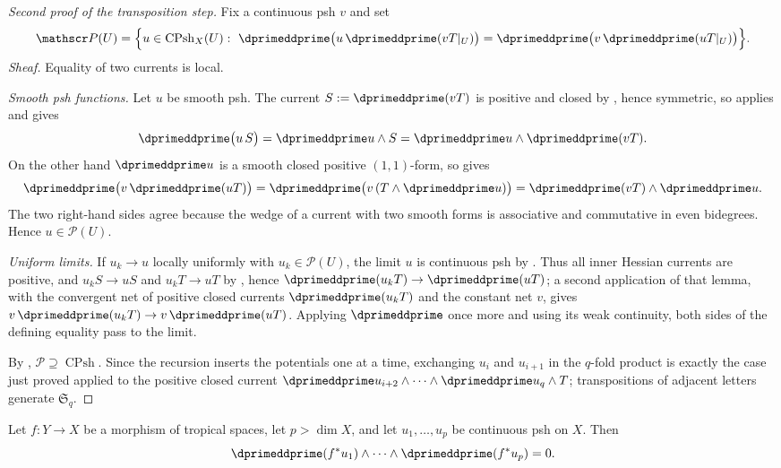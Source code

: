 \begin{proof}[Second proof of the transposition step]
Fix a continuous psh $v$ and set
\[
 \mathscr P(U)=\Bigl\{u\in\operatorname{CPsh}_X(U):\
  \dprimeddprime\bigl(u\,\dprimeddprime(vT|_U)\bigr)
  =\dprimeddprime\bigl(v\,\dprimeddprime(uT|_U)\bigr)\Bigr\}.
\]
\emph{Sheaf.}  Equality of two currents is local.

\emph{Smooth psh functions.}  Let $u$ be smooth psh.  The current
$S:=\dprimeddprime(vT)$ is positive and closed by
, hence symmetric, so
 applies and gives
\[
 \dprimeddprime\bigl(u\,S\bigr)=\dprimeddprime u\wedge S
 =\dprimeddprime u\wedge\dprimeddprime(vT).
\]
On the other hand $\dprimeddprime u$ is a smooth closed positive
$(1,1)$-form, so \Cref{prop:ch16-smooth-factor} gives
\[
 \dprimeddprime\bigl(v\,\dprimeddprime(uT)\bigr)
 =\dprimeddprime\bigl(v\,(T\wedge\dprimeddprime u)\bigr)
 =\dprimeddprime(vT)\wedge\dprimeddprime u .
\]
The two right-hand sides agree because the wedge of a current with two
smooth forms is associative and commutative in even bidegrees.  Hence
$u\in\mathscr P(U)$.

\emph{Uniform limits.}  If $u_k\to u$ locally uniformly with
$u_k\in\mathscr P(U)$, the limit $u$ is continuous psh by
.  Thus all inner Hessian currents are
positive, and $u_kS\to uS$ and
$u_kT\to uT$ by , hence
$\dprimeddprime(u_kT)\to\dprimeddprime(uT)$; a second application of that
lemma, with the convergent net of positive closed currents
$\dprimeddprime(u_kT)$ and the constant net $v$, gives
$v\,\dprimeddprime(u_kT)\to v\,\dprimeddprime(uT)$.  Applying
$\dprimeddprime$ once more and using its weak continuity, both sides of the
defining equality pass to the limit.

By , $\mathscr P\supseteq\operatorname{CPsh}$.
Since the recursion inserts the potentials one at a time, exchanging
$u_i$ and $u_{i+1}$ in the $q$-fold product is exactly the case just proved
applied to the positive closed current
$\dprimeddprime u_{i+2}\wedge\cdots\wedge\dprimeddprime u_q\wedge T$;
transpositions of adjacent letters generate $\mathfrak S_q$.
\end{proof}

\begin{proposition}
\label{prop:ch16-vanishing-above-dimension}
Let $f:Y\to X$ be a morphism of tropical spaces, let
$p>\dim X$, and let $u_1,\ldots,u_p$ be continuous psh on $X$.  Then
\[
 \dprimeddprime(f^*u_1)\wedge\cdots\wedge\dprimeddprime(f^*u_p)=0 .
\]
\end{proposition}

